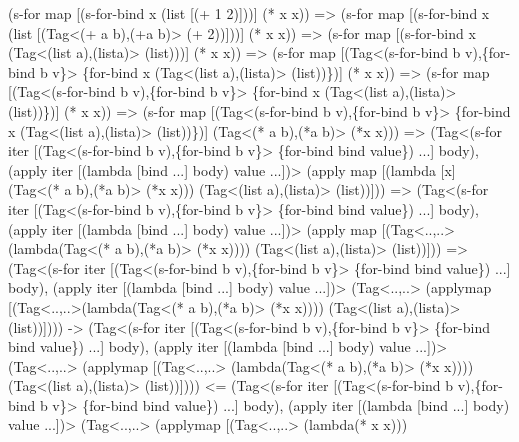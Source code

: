 \begin{Codes}
   (s-for map
     [(s-for-bind x (list [(+ 1 2)]))]
     (* x x))
=> (s-for map [(s-for-bind x (list
     [(Tag<(+ a b),(+\C a b)> (+ 2))]))] (* x x))
=> (s-for map [(s-for-bind x (Tag<(list a),(list\C a)> (list\C
     [(Tag<(+ a b),(+\C a b)> (+\C 1 2))])))] (* x x))
=> (s-for map
     [(Tag<(s-for-bind b v),\{for-bind b v\}> \{for-bind x
       (Tag<(list a),(list\C a)> (list\C
         [(Tag<(+ a b),(+\C a b)> (+\C 1 2))]))\})] (* x x))
=> (s-for map
     [(Tag<(s-for-bind b v),\{for-bind b v\}> \{for-bind x
       (Tag<(list a),(list\C a)> (list\C
         [(Tag<(+ a b),(+\C a b)> (+\C 1 2))]))\})] (* x x))
=> (s-for map
     [(Tag<(s-for-bind b v),\{for-bind b v\}> \{for-bind x
       (Tag<(list a),(list\C a)> (list\C
         [(Tag<(+ a b),(+\C a b)> (+\C 1 2))]))\})]
     (Tag<(* a b),(*\C a b)>
       (*\C x x)))
=> (Tag<(s-for iter
         [(Tag<(s-for-bind b v),\{for-bind b v\}>
             \{for-bind bind value\}) ...]
           body),
         (apply iter [(lambda [bind ...] body) value ...])>
      (apply map [(lambda [x] (Tag<(* a b),(*\C a b)> (*\C x x)))
        (Tag<(list a),(list\C a)> (list\C
          [(Tag<(+ a b),(+\C a b)> (+\C 1 2))]))]))
=> (Tag<(s-for iter
         [(Tag<(s-for-bind b v),\{for-bind b v\}>
             \{for-bind bind value\}) ...]
           body),
         (apply iter [(lambda [bind ...] body) value ...])>
      (apply map [(Tag<..,..> (lambda\C [x]
          (Tag<(* a b),(*\C a b)> (*\C x x))))
        (Tag<(list a),(list\C a)> (list\C
          [(Tag<(+ a b),(+\C a b)> (+\C 1 2))]))]))
=> (Tag<(s-for iter
         [(Tag<(s-for-bind b v),\{for-bind b v\}>
             \{for-bind bind value\}) ...]
           body),
         (apply iter [(lambda [bind ...] body) value ...])>
      (Tag<..,..> (apply\C map [(Tag<..,..>(lambda\C [x]
          (Tag<(* a b),(*\C a b)> (*\C x x))))
        (Tag<(list a),(list\C a)> (list\C
          [(Tag<(+ a b),(+\C a b)> (+\C 1 2))]))])))
-> (Tag<(s-for iter
         [(Tag<(s-for-bind b v),\{for-bind b v\}>
             \{for-bind bind value\}) ...]
           body),
         (apply iter [(lambda [bind ...] body) value ...])>
      (Tag<..,..> (apply\C map [(Tag<..,..> (lambda\C [x]
           (Tag<(* a b),(*\C a b)> (*\C x x))))
        (Tag<(list a),(list\C a)> (list\C [3]))])))
<= (Tag<(s-for iter
         [(Tag<(s-for-bind b v),\{for-bind b v\}>
             \{for-bind bind value\}) ...]
           body),
         (apply iter [(lambda [bind ...] body) value ...])>
      (Tag<..,..> (apply\C map [(Tag<..,..> (lambda\C [x] (* x x)))

\end{Codes}
